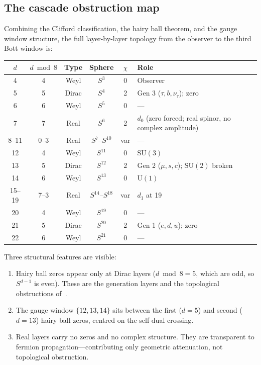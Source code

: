 \documentclass[12pt,a4paper]{article}
\begin{document}
\subsection{The cascade obstruction map}

Combining the Clifford classification, the hairy ball theorem, and the gauge window
structure, the full layer-by-layer topology from the observer to the third Bott window is:

\begin{center}
\begin{tabular}{cccccl}
\toprule
$d$ & $d\bmod 8$ & Type & Sphere & $\chi$ & Role \\
\midrule
4  & 4 & Weyl  & $S^3$  & 0 & Observer \\
5  & 5 & Dirac & $S^4$  & 2 & Gen 3 ($\tau,b,\nu_\tau$); zero \\
6  & 6 & Weyl  & $S^5$  & 0 & --- \\
7  & 7 & Real  & $S^6$  & 2 & $d_0$ (zero forced; real spinor, no complex amplitude) \\
8--11 & 0--3 & Real & $S^7$--$S^{10}$ & var & --- \\
12 & 4 & Weyl  & $S^{11}$ & 0 & $\mathrm{SU}(3)$ \\
13 & 5 & Dirac & $S^{12}$ & 2 & Gen 2 ($\mu,s,c$); $\mathrm{SU}(2)$ broken \\
14 & 6 & Weyl  & $S^{13}$ & 0 & $\mathrm{U}(1)$ \\
15--19 & 7--3 & Real & $S^{14}$--$S^{18}$ & var & $d_1$ at 19 \\
20 & 4 & Weyl  & $S^{19}$ & 0 & --- \\
21 & 5 & Dirac & $S^{20}$ & 2 & Gen 1 ($e,d,u$); zero \\
22 & 6 & Weyl  & $S^{21}$ & 0 & --- \\
\bottomrule
\end{tabular}
\end{center}

Three structural features are visible:
\begin{enumerate}
\item Hairy ball zeros appear only at Dirac layers ($d\bmod 8=5$, which are odd, so $S^{d-1}$
is even). These are the generation layers and the topological obstructions of~\cite{paperIVb}.
\item The gauge window $\{12,13,14\}$ sits between the first ($d=5$) and second ($d=13$)
hairy ball zeros, centred on the self-dual crossing.
\item Real layers carry no zeros and no complex structure. They are transparent to fermion
propagation---contributing only geometric attenuation, not topological obstruction.
\end{enumerate}
\end{document}

